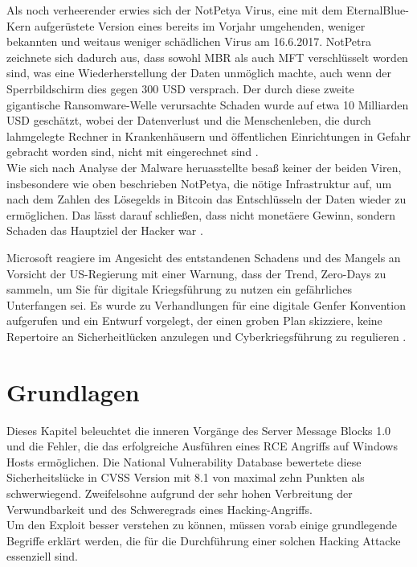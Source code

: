\documentclass[DIV=12,headings=normal,pdftex,headinclude=false,footinclude=false,final]{scrreprt}
\begin{document}
\noindent
Als noch verheerender erwies sich der NotPetya Virus, eine mit dem EternalBlue-Kern aufgerüstete Version eines bereits im Vorjahr umgehenden, weniger bekannten und weitaus weniger schädlichen Virus am 16.6.2017. NotPetra zeichnete sich dadurch aus, dass sowohl MBR als auch MFT verschlüsselt worden sind, was eine Wiederherstellung der Daten unmöglich machte, auch wenn der Sperrbildschirm dies gegen 300 USD versprach. Der durch diese zweite gigantische Ransomware-Welle verursachte Schaden wurde auf etwa 10 Milliarden USD geschätzt, wobei der Datenverlust und die Menschenleben, die durch lahmgelegte Rechner in Krankenhäusern und öffentlichen Einrichtungen in Gefahr gebracht worden sind, nicht mit eingerechnet sind \cite{Avast}.\\
Wie sich nach Analyse der Malware heruasstellte besaß keiner der beiden Viren, insbesondere wie oben beschrieben NotPetya, die nötige Infrastruktur auf, um nach dem Zahlen des Lösegelds in Bitcoin das Entschlüsseln der Daten wieder zu ermöglichen. Das lässt darauf schließen, dass nicht monetäere Gewinn, sondern Schaden das Hauptziel der Hacker war \cite{Sil}.

\noindent
Microsoft reagiere im Angesicht des entstandenen Schadens und des Mangels an Vorsicht der US-Regierung mit einer Warnung, dass der Trend, Zero-Days zu sammeln, um Sie für digitale Kriegsführung zu nutzen ein gefährliches Unterfangen sei. Es wurde zu Verhandlungen für eine digitale Genfer Konvention aufgerufen und ein Entwurf vorgelegt, der einen groben Plan skizziere, keine Repertoire an Sicherheitlücken anzulegen und Cyberkriegsführung zu regulieren \cite{MS:EB}.

\chapter{Grundlagen}
Dieses Kapitel beleuchtet die inneren Vorgänge des Server Message Blocks 1.0 und die Fehler, die das erfolgreiche Ausführen eines RCE Angriffs auf Windows Hosts ermöglichen. Die National Vulnerability Database bewertete diese Sicherheitslücke in CVSS Version mit 8.1 von maximal zehn Punkten \cite{NVD} als schwerwiegend. Zweifelsohne aufgrund der sehr hohen Verbreitung der Verwundbarkeit und des Schweregrads eines Hacking-Angriffs. \\
Um den Exploit besser verstehen zu können, müssen vorab einige grundlegende Begriffe erklärt werden, die für die Durchführung einer solchen Hacking Attacke essenziell sind.
\end{document}
